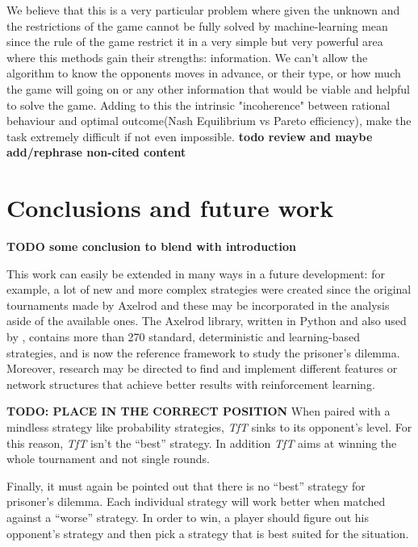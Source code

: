 \documentclass[journal,a4paper,10pt,twoside]{IEEEtran} %
\begin{document}
We believe that this is a very particular problem where given the unknown and the restrictions of the game cannot be fully solved by machine-learning mean since the rule of the game restrict it in a very simple but very powerful area where this methods gain their strengths: information. We can't allow the algorithm to know the opponents moves in advance, or their type, or how much the game will going on or any other information that would be viable and helpful to solve the game. Adding to this the intrinsic "incoherence" between rational behaviour and optimal outcome(Nash Equilibrium vs Pareto efficiency), make the task extremely difficult if not even impossible.
\textbf{todo review and maybe add/rephrase non-cited content}

\section{Conclusions and future work} \label{s:conc}
\textbf{TODO some conclusion to blend with introduction}

This work can easily be extended in many ways in a future development: for example, a lot of new and more complex strategies were created since the original tournaments made by Axelrod and these may be incorporated in the analysis aside of the available ones.
The Axelrod library, \cite{Knight2016Axel,axel-lib} written in Python and also used by \cite{plosRLdominant}, contains more than 270 standard, deterministic and learning-based strategies, and is now the reference framework to study the prisoner's dilemma.
Moreover, research may be directed to find and implement different features or network structures that achieve better results with reinforcement learning.

\textbf{TODO: PLACE IN THE CORRECT POSITION}
When paired with a mindless strategy like probability strategies, \textit{TfT} sinks to its opponent's level. For this reason, \textit{TfT} isn't the ``best'' strategy. In addition \textit{TfT} aims at winning the whole tournament and not single rounds.

Finally, it must again be pointed out that there is no ``best'' strategy for prisoner's dilemma. Each individual strategy will work better when matched against a ``worse'' strategy. In order to win, a player should figure out his opponent's strategy and then pick a strategy that is best suited for the situation.

\balance



\onecolumn
{}\label{appendix}
\end{document}
